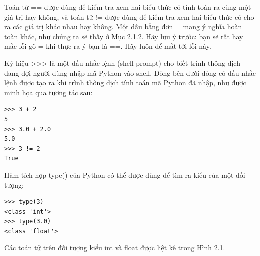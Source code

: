 Toán tử == được dùng để kiểm tra xem hai biểu thức có tính toán ra cùng một giá trị hay không, và toán tử != được dùng để kiểm tra xem hai biểu thức có cho ra các giá trị khác nhau hay không. Một dấu bằng đơn = mang ý nghĩa hoàn toàn khác, như chúng ta sẽ thấy ở Mục 2.1.2. Hãy lưu ý trước: bạn sẽ rất hay mắc lỗi gõ = khi thực ra ý bạn là ==. Hãy luôn để mắt tới lỗi này.

Ký hiệu >>> là một dấu nhắc lệnh (shell prompt) cho biết trình thông dịch đang đợi người dùng nhập mã Python vào shell. Dòng bên dưới dòng có dấu nhắc lệnh được tạo ra khi trình thông dịch tính toán mã Python đã nhập, như được minh họa qua tương tác sau:

\begin{verbatim}
>>> 3 + 2
5
>>> 3.0 + 2.0
5.0
>>> 3 != 2
True    
\end{verbatim}


Hàm tích hợp type() của Python có thể được dùng để tìm ra kiểu của một đối tượng:

\begin{verbatim}
>>> type(3)
<class 'int'>
>>> type(3.0)
<class 'float'>    
\end{verbatim}


Các toán tử trên đối tượng kiểu int và float được liệt kê trong Hình 2.1.

